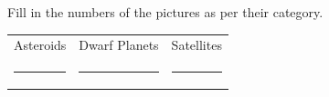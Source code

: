 Fill in the numbers of the pictures as per their category.
\begin{center}\begin{tabular}{lll}
Asteroids & Dwarf Planets & Satellites\\
\rule{3cm}{0.1pt} & \rule{3cm}{0.1pt} & \rule{3cm}{0.1pt}
\end{tabular}\end{center}
